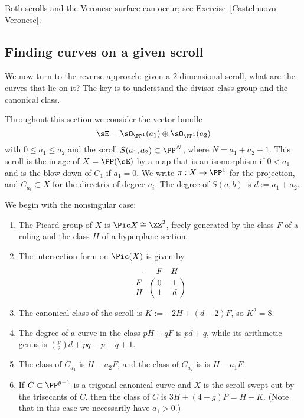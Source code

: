 Both scrolls and the Veronese surface can occur; see Exercise~\ref{Castelnuovo Veronese}.

\subsection{Finding curves on a given scroll}

We now turn to the reverse approach: given a 2-dimensional scroll, what are the curves that lie on it?
The key is to understand the divisor class group and the canonical class.

 Throughout this section we consider the vector bundle 
$$
\sE = \sO_{\PP^1}(a_1) \oplus\sO_{\PP^1}(a_2)
$$
with $0\leq a_1\leq a_2$ and the 
scroll $ S(a_1, a_2) \subset \PP^N$, where $N = a_1+a_2+1$. This scroll is the image of $X = \PP(\sE)$ by a map that is an isomorphism
if $0<a_1$ and is the blow-down of  $C_1$ if $a_1=0$.  We write $\pi:X \to \PP^1$ for the projection, and
$C_{a_i}\subset X$ for the directrix of degree $a_i$. The degree of $S(a,b)$ is $d := a_1+a_2$.

 We begin with the nonsingular case:

\begin{theorem}\label{pic of scroll}
\begin{enumerate} Suppose that $0<a_{1}$.

\item The Picard group of $X$ is $\Pic X \cong \ZZ^2$, freely generated by  the class $F$ of a ruling and the class $H$ of a  hyperplane section. 
\item The
intersection form on $\Pic(X)$ is given by
$$
\bordermatrix{\kern 10pt\cdot&F&H\cr
F&0&1\cr
H&1&d
}
$$

\item The canonical class of the scroll is $K := -2H +(d-2)F$, so $K^2 = 8$.

\item The degree of a curve in the class $pH+qF$ is $pd+q$, while its arithmetic genus is
${p\choose 2}d+pq-p-q+1$.

\item The class of $C_{a_1}$
is $H-a_2F$, and the class of $C_{a_2}$ is 
is $H-a_1F$. 
\item If $C \subset \PP^{g-1}$ is a trigonal canonical curve and $X$ is the scroll swept out by the trisecants of $C$, then the class of $C$ is $3H+(4-g)F = H-K$. (Note that in this case we necessarily have $a_1 > 0$.)
\end{enumerate}
\end{theorem}

